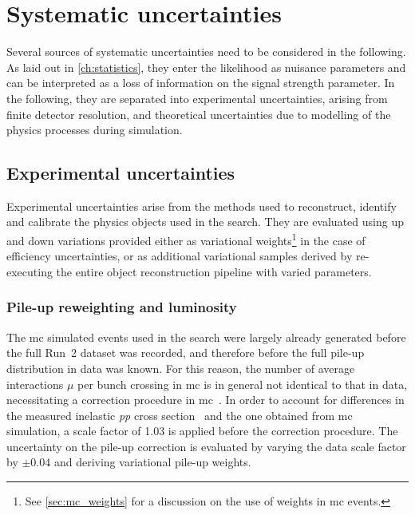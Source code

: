 

\chapter{Systematic uncertainties}\label{ch:uncertainties}

\graphicspath{{chapter-uncertainties/Figs/Vector/}{chapter-uncertainties/Figs/}}

Several sources of systematic uncertainties need to be considered in the following. As laid out in \cref{ch:statistics}, they enter the likelihood as nuisance parameters and can be interpreted as a loss of information on the signal strength parameter. In the following, they are separated into experimental uncertainties, arising \eg from finite detector resolution, and theoretical uncertainties due to modelling of the physics processes during simulation. 

\section{Experimental uncertainties}

Experimental uncertainties arise from the methods used to reconstruct, identify and calibrate the physics objects used in the \onelepton search.
They are evaluated using up and down variations provided either as variational weights\footnote{See \cref{sec:mc_weights} for a discussion on the use of weights in \gls{mc} events.} in the case of efficiency uncertainties, or as additional variational samples derived by re-executing the entire object reconstruction pipeline with varied parameters.

\subsection{Pile-up reweighting and luminosity}

The \gls{mc} simulated events used in the \onelepton search were largely already generated before the full Run~2 dataset was recorded, and therefore before the full pile-up distribution in data was known.
For this reason, the number of average interactions $\mu$ per bunch crossing in \gls{mc} is in general not identical to that in data, necessitating a correction procedure in \gls{mc}~\cite{Buttinger:2014726}.
In order to account for differences in the measured inelastic \textit{pp} cross section~\cite{STDM-2015-05} and the one obtained from \gls{mc} simulation, a scale factor of 1.03 is applied before the correction procedure.
The uncertainty on the pile-up correction is evaluated by varying the data scale factor by $\pm 0.04$ and deriving variational pile-up weights.

